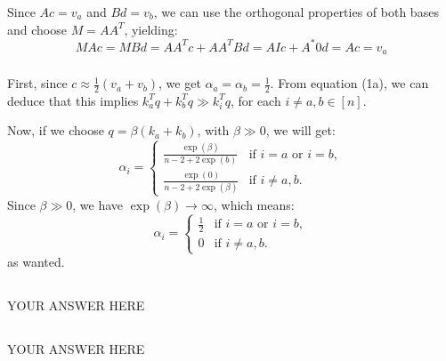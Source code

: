 \documentclass{article}
\begin{document}
Since \( Ac = v_a \) and \( Bd = v_b \), we can use the orthogonal properties of both bases and choose \( M = AA^T \), yielding:
\[
MAc = MBd = A A^T c + A A^T B d = A I c + A^* 0 d = A c = v_a
\]

\subsubsection{}
First, since \( c \approx \frac{1}{2} (v_a + v_b) \), we get \( \alpha_a = \alpha_b = \frac{1}{2} \). From equation (1a), we can deduce that this implies \( k_a^T q + k_b^T q \gg k_i^T q \), for each \( i \neq a, b \in [n] \).

Now, if we choose \( q = \beta (k_a + k_b) \), with \( \beta \gg 0 \), we will get:
\[
\alpha_i = \left\{
\begin{array}{ll}
\frac{\exp(\beta)}{n - 2 + 2 \exp(b)} & \text{if } i = a \text{ or } i = b, \\
\frac{\exp(0)}{n - 2 + 2 \exp(\beta)} & \text{if } i \neq a, b.
\end{array}
\right.
\]
Since \( \beta \gg 0 \), we have \( \exp(\beta) \to \infty \), which means:
\[
\alpha_i = \left\{
\begin{array}{ll}
\frac{1}{2} & \text{if } i = a \text{ or } i = b, \\
0 & \text{if } i \neq a, b.
\end{array}
\right.
\]
as wanted.

\subsection{}
YOUR ANSWER HERE
\subsection{}
YOUR ANSWER HERE
\end{document}

